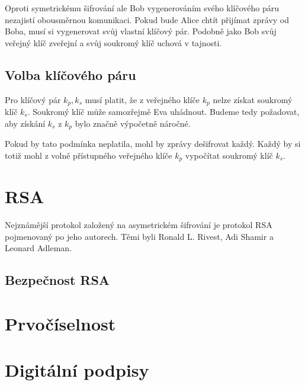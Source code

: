 \documentclass[
  program=infoi,
  biblatex,
  figures=false,
  glossaries,
  index
]{kidiplom}
\begin{document}
    Oproti symetrickému šifrování ale Bob vygenerováním svého klíčového páru nezajistí obousměrnou komunikaci.
    Pokud bude Alice chtít přijímat zprávy od Boba, musí si vygenerovat svůj vlastní klíčový pár.
    Podobně jako Bob svůj veřejný klíč zveřejní a svůj soukromý klíč uchová v tajnosti.


    \subsection{Volba klíčového páru}

        Pro klíčový pár $k_p, k_s$ musí platit, že z veřejného klíče $k_p$ nelze získat soukromý klíč $k_s$.
        Soukromý klíč může samozřejmě Eva uhádnout.
        Budeme tedy požadovat, aby získání $k_s$ z $k_p$ bylo značně výpočetně náročné.

        Pokud by tato podmínka neplatila, mohl by zprávy dešifrovat každý.
        Každý by si totiž mohl z volně přístupného veřejného klíče $k_p$ vypočítat soukromý klíč $k_s$.


\section{RSA}\label{sec:RSA}



    Nejznámější protokol založený na asymetrickém šifrování je protokol RSA pojmenovaný po jeho autorech.
    Těmi byli Ronald L. Rivest, Adi Shamir a Leonard Adleman.






    \subsection{Bezpečnost RSA}\label{sub:RSA-security}



\section{Prvočíselnost}\label{sec:primality}





\section{Digitální podpisy}\label{sec:digital-signatures}
\end{document}
